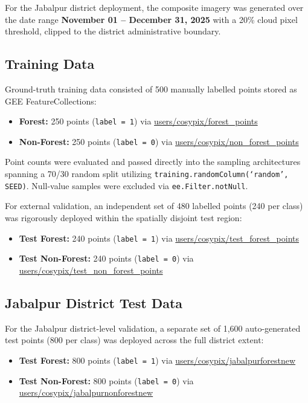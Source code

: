 \documentclass[12pt, a4paper, twocolumn]{article}
\begin{document}
For the Jabalpur district deployment, the composite imagery was generated over the date range \textbf{November 01 -- December 31, 2025} with a 20\% cloud pixel threshold, clipped to the district administrative boundary.

\subsection{Training Data}

Ground-truth training data consisted of 500 manually labelled points stored as GEE FeatureCollections:

\begin{itemize}
    \item \textbf{Forest:} 250 points (\texttt{label = 1}) via \url{users/cosypix/forest_points}
    \item \textbf{Non-Forest:} 250 points (\texttt{label = 0}) via \url{users/cosypix/non_forest_points}
\end{itemize}

Point counts were evaluated and passed directly into the sampling architectures spanning a 70/30 random split utilizing \texttt{training.randomColumn(`random', SEED)}.
Null-value samples were excluded via \texttt{ee.Filter.notNull}.

For external validation, an independent set of 480 labelled points (240 per class) was rigorously deployed within the spatially disjoint test region:

\begin{itemize}
    \item \textbf{Test Forest:} 240 points (\texttt{label = 1}) via \url{users/cosypix/test_forest_points}
    \item \textbf{Test Non-Forest:} 240 points (\texttt{label = 0}) via \url{users/cosypix/test_non_forest_points}
\end{itemize}

\subsection{Jabalpur District Test Data}
\label{subsec:jbp_data}

For the Jabalpur district-level validation, a separate set of 1,600 auto-generated test points (800 per class) was deployed across the full district extent:

\begin{itemize}
    \item \textbf{Test Forest:} 800 points (\texttt{label = 1}) via \url{users/cosypix/jabalpurforestnew}
    \item \textbf{Test Non-Forest:} 800 points 
(\texttt{label = 0}) via \url{users/cosypix/jabalpurnonforestnew}
\end{itemize}
\end{document}
